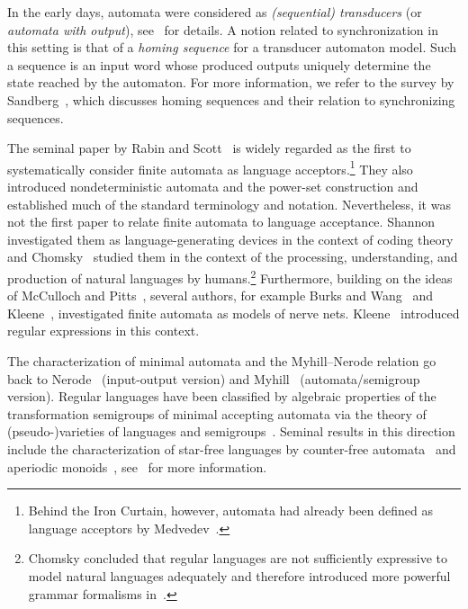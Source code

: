  
In the early days, automata were considered as \emph{(sequential) transducers} (or \emph{automata with output}), see~\cite{HopUll79,Sandberg04} for details.
A notion related to synchronization in this setting is that of a \emph{homing sequence} for a transducer automaton model. Such a sequence is an input word whose produced outputs uniquely determine the state reached by the automaton. For more information, we refer to the survey by Sandberg~\cite{Sandberg04}, which discusses homing sequences and their relation to synchronizing sequences.

The seminal paper by Rabin and Scott~\cite{DBLP:journals/ibmrd/RabinS59} is widely regarded as the first to systematically consider finite automata as language acceptors.\footnote{Behind the Iron Curtain, however, automata had already been defined as language acceptors by Medvedev~\cite{Medvedev56}.} They also introduced nondeterministic automata and the power-set construction and established much of the standard terminology and notation.
Nevertheless, it was not the first paper to relate finite automata to language acceptance. Shannon~\cite{Shannon:1948:MTCa} investigated them as language-generating devices in the context of coding theory and Chomsky~\cite{DBLP:journals/tit/Chomsky56,DBLP:journals/iandc/ChomskyM58} studied them in the context of the processing, understanding, and production of natural languages by humans.\footnote{Chomsky concluded that regular languages are not sufficiently expressive to model natural languages adequately and therefore introduced more powerful grammar formalisms in~\cite{DBLP:journals/tit/Chomsky56}.} Furthermore, building on the ideas of McCulloch and Pitts~\cite{McCullochPitts43}, several authors, for example Burks and Wang~\cite{DBLP:journals/jacm/BurksW57,DBLP:journals/jacm/BurksW57a} and Kleene~\cite{Kleene56},
investigated finite automata as models of nerve nets. Kleene~\cite{Kleene56}
introduced regular expressions in this context.

The characterization of minimal automata and the Myhill--Nerode relation
go back to Nerode~\cite{nerode1958linear} (input-output version)
and Myhill~\cite{myhill1957finite} (automata/semigroup version).
Regular languages have been classified by algebraic properties of 
the transformation semigroups of minimal accepting automata
via the theory of (pseudo-)varieties of languages
and semigroups~\cite{Eilenberg1976,EILENBERG1976413,Pin86}. Seminal
results in this direction include the characterization of star-free
languages by counter-free automata~\cite{McNaughton71}
and aperiodic monoids~\cite{DBLP:journals/iandc/Schutzenberger65a},
see~\cite{Eilenberg1974,Eilenberg1976,Pin86,DBLP:reference/hfl/Pin97,Pin2022} 
for more information.


